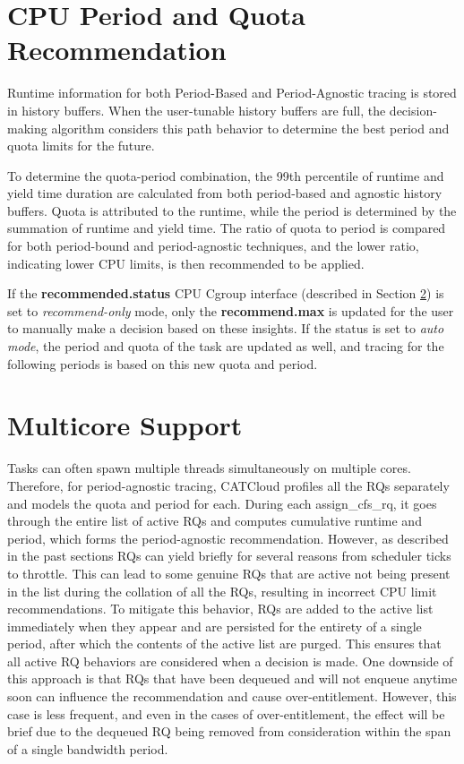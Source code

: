 \section{CPU Period and Quota Recommendation}
Runtime information for both Period-Based and Period-Agnostic tracing is stored in history buffers. When the user-tunable history buffers are full, the decision-making algorithm considers this path behavior to determine the best period and quota limits for the future.

To determine the quota-period combination, the 99th percentile of runtime and yield time duration are calculated from both period-based and agnostic history buffers. Quota is attributed to the runtime, while the period is determined by the summation of runtime and yield time. The ratio of quota to period is compared for both period-bound and period-agnostic techniques, and the lower ratio, indicating lower CPU limits, is then recommended to be applied.

If the \textbf{recommended.status} CPU Cgroup interface (described in Section \ref{sec:multicore}) is set to \textit{recommend-only} mode, only the \textbf{recommend.max} is updated for the user to manually make a decision based on these insights. If the status is set to \textit{auto mode}, the period and quota of the task are updated as well, and tracing for the following periods is based on this new quota and period.

\section{Multicore Support}
\label{sec:multicore}
Tasks can often spawn multiple threads simultaneously on multiple cores. Therefore, for period-agnostic tracing, CATCloud profiles all the RQs separately and models the quota and period for each. During each assign\_cfs\_rq, it goes through the entire list of active RQs and computes cumulative runtime and period, which forms the period-agnostic recommendation. However, as described in the past sections RQs can yield briefly for several reasons from scheduler ticks to throttle. This can lead to some genuine RQs that are active not being present in the list during the collation of all the RQs, resulting in incorrect CPU limit recommendations. To mitigate this behavior, RQs are added to the active list immediately when they appear and are persisted for the entirety of a single period, after which the contents of the active list are purged. This ensures that all active RQ behaviors are considered when a decision is made. One downside of this approach is that RQs that have been dequeued and will not enqueue anytime soon can influence the recommendation and cause over-entitlement. However, this case is less frequent, and even in the cases of over-entitlement, the effect will be brief due to the dequeued RQ being removed from consideration within the span of a single bandwidth period.

